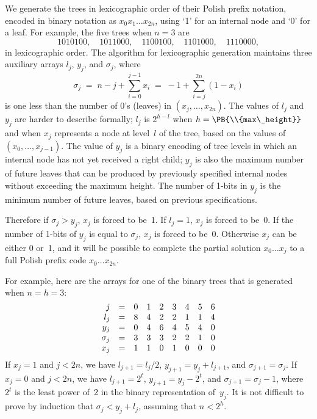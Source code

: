 We generate the trees in lexicographic order of their Polish prefix
notation, encoded in binary notation as $x_0x_1\ldots x_{2n}$, using `1'
for an internal node and `0' for a leaf. For example, the five
trees when $n=3$ are
$$1010100,\quad 1011000,\quad 1100100,\quad 1101000,\quad 1110000,$$
in lexicographic order. The algorithm for lexicographic generation maintains
three auxiliary arrays $l_j$, $y_j$, and $\sigma_j$, where
$$\sigma_j\;=\;n-j+\sum_{i=0}^{j-1}x_i\;=\;-1+\sum_{i=j}^{2n}(1-x_i)$$
is one less than the number of 0's (leaves) in $(x_j,\ldots,x_{2n})$.
The values of $l_j$ and $y_j$ are harder
to describe formally; $l_j$ is $2^{h-l}$ when $h=\PB{\\{max\_height}}$ and when
$x_j$ represents a node at level~$l$ of the tree, based on the values
of $(x_0,\ldots,x_{j-1})$. The value of $y_j$ is a binary encoding of
tree levels in which an internal node has not yet received a right child;
$y_j$ is also the maximum number of future leaves that can be produced by
previously specified internal nodes without exceeding the maximum height.
The number of 1-bits in $y_j$ is the minimum number of future leaves,
based on previous specifications.

Therefore if $\sigma_j>y_j$, $x_j$ is forced to be~1. If $l_j=1$,
$x_j$ is forced to be~0. If the number of 1-bits of $y_j$ is equal
to $\sigma_j$, $x_j$ is forced to be~0. Otherwise $x_j$ can be
either 0 or~1, and it will be possible to complete the partial
solution $x_0\ldots x_j$ to a full Polish prefix code $x_0\ldots x_{2n}$.

For example, here are the arrays for one of the binary trees
that is generated when $n=h=3$:
$$\vcenter{\halign{$\hfil#$\quad=&&\quad#\cr
j       &0&1&2&3&4&5&6\cr
l_j     &8&4&2&2&1&1&4\cr
y_j     &0&4&6&4&5&4&0\cr
\sigma_j&3&3&3&2&2&1&0\cr
x_j     &1&1&0&1&0&0&0\cr}}$$
If $x_j=1$ and $j<2n$, we have $l_{j+1}=l_j/2$, $y_{j+1}=y_j+l_{j+1}$,
and $\sigma_{j+1}=\sigma_j$. If $x_j=0$ and $j<2n$, we have $l_{j+1}=
2^t$, $y_{j+1}=y_j-2^t$, and $\sigma_{j+1}=\sigma_j-1$, where $2^t$ is the
least power of~2 in the binary representation of~$y_j$. It is not difficult to
prove by induction that $\sigma_j<y_j+l_j$, assuming that $n<2^h$.

